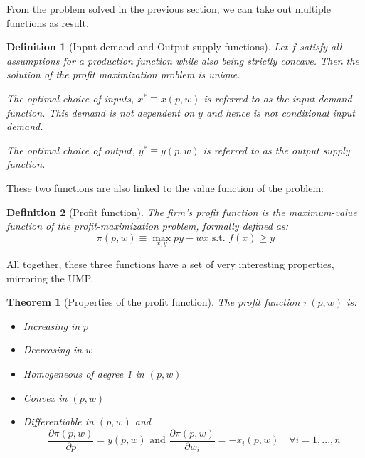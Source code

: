 \documentclass[12pt]{report}
\newtheorem{theorem}{Theorem}[chapter]
\newtheorem{definition}{Definition}[chapter]
\begin{document}
From the problem solved in the previous section, we can take out multiple functions as result.

\begin{definition}[Input demand and Output supply functions]
Let $f$ satisfy all assumptions for a production function while also being strictly concave. Then the solution of the profit maximization problem is unique.

The optimal choice of inputs, $x^*\equiv x(p,w)$ is referred to as the input demand function. This demand is not dependent on $y$ and hence is not conditional input demand.

The optimal choice of output, $y^*\equiv y(p,w)$ is referred to as the output supply function.
\end{definition}

These two functions are also linked to the value function of the problem:

\begin{definition}[Profit function]
The firm's profit function is the maximum-value function of the profit-maximization problem, formally defined as: $$\pi(p,w) \equiv \max_{x,y} py - wx \text{ s.t. } f(x)\geq y $$
\end{definition}

All together, these three functions have a set of very interesting properties, mirroring the UMP.

\begin{theorem}[Properties of the profit function]
The profit function $\pi(p,w)$ is:\begin{itemize}
\item Increasing in $p$
\item Decreasing in $w$
\item Homogeneous of degree 1 in $(p,w)$
\item Convex in $(p,w)$
\item Differentiable in $(p,w)$ and $$\frac{\partial \pi(p,w)}{\partial p} = y(p,w) \text{ and } \frac{\partial \pi(p,w)}{\partial w_i} = -x_i(p,w) \quad \forall i = 1, ..., n $$
\end{itemize}
\end{theorem}
\end{document}
